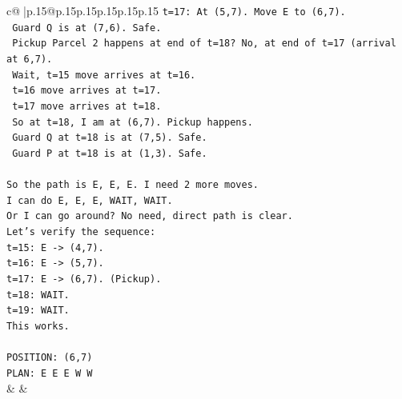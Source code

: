 \documentclass{article}
\begin{document}
{\begin{supertabular}{c@{$\;$}|p{.15\linewidth}@{}p{.15\linewidth}p{.15\linewidth}p{.15\linewidth}p{.15\linewidth}p{.15\linewidth}}
{{{\texttt{t=17: At (5,7). Move E to (6,7).} \\
\texttt{  Guard Q is at (7,6). Safe.} \\
\texttt{  Pickup Parcel 2 happens at end of t=18? No, at end of t=17 (arrival at 6,7).} \\
\texttt{  Wait, t=15 move arrives at t=16.} \\
\texttt{  t=16 move arrives at t=17.} \\
\texttt{  t=17 move arrives at t=18.} \\
\texttt{  So at t=18, I am at (6,7). Pickup happens.} \\
\texttt{  Guard Q at t=18 is at (7,5). Safe.} \\
\texttt{  Guard P at t=18 is at (1,3). Safe.} \\
\\ 
\texttt{So the path is E, E, E. I need 2 more moves.} \\
\texttt{I can do E, E, E, WAIT, WAIT.} \\
\texttt{Or I can go around? No need, direct path is clear.} \\
\texttt{Let's verify the sequence:} \\
\texttt{t=15: E {-}> (4,7).} \\
\texttt{t=16: E {-}> (5,7).} \\
\texttt{t=17: E {-}> (6,7). (Pickup).} \\
\texttt{t=18: WAIT.} \\
\texttt{t=19: WAIT.} \\
\texttt{This works.} \\
\\ 
\texttt{POSITION: (6,7)} \\
\texttt{PLAN: E E E W W} \\
            }
        }
    }
    & & \\ \\


\end{supertabular}}
\end{document}
